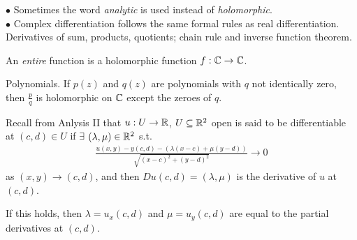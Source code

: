 \documentclass[a4paper]{article}
\begin{document}
\begin{rem}
$\bullet$ Sometimes the word \emph{analytic} is used instead of \emph{holomorphic}.\\
$\bullet$ Complex differentiation follows the same formal rules as real differentiation. Derivatives of sum, products, quotients; chain rule and inverse function theorem.
\end{rem}

\begin{defi}
An \emph{entire} function is a holomorphic function $f:\mathbb{C} \to \mathbb{C}$.
\end{defi}

\begin{eg}
Polynomials. If $p(z)$ and $q(z)$ are polynomials with $q$ not identically zero, then $\frac{p}{q}$ is holomorphic on $\mathbb{C}$ except the zeroes of $q$.
\end{eg}

Recall from Anlysis II that $u:U \to \mathbb{R}$, $U \subseteq \mathbb{R}^2$ open is said to be differentiable at $(c,d) \in U$ if $\exists$ $(\lambda,\mu) \in \mathbb{R}^2$ s.t.
\begin{equation*}
\begin{aligned}
\frac{u(x,y)-y(c,d)-(\lambda(x-c)+\mu(y-d))}{\sqrt{(x-c)^2+(y-d)^2}} \to 0
\end{aligned}
\end{equation*}
as $(x,y) \to (c,d)$, and then $Du(c,d)=(\lambda,\mu)$ is the derivative of $u$ at $(c,d)$.

If this holds, then $\lambda = u_x(c,d)$ and $\mu = u_y(c,d)$ are equal to the partial derivatives at $(c,d)$.
\end{document}
